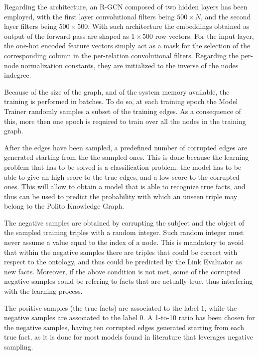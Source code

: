 \documentclass[%
    corpo=13.5pt,
    twoside,
    oldstyle,
    tipotesi=magistrale,
    greek,
    evenboxes
]{toptesi}
\begin{document}
Regarding the architecture, an R-GCN composed of two hidden layers has been employed,
with the first layer convolutional filters being $500 \times N$, and the second
layer filters being $500 \times 500$.
With such architecture the embeddings obtained as output of the forward pass
are shaped as $1 \times 500$ row vectors.
For the input layer, the one-hot encoded feature vectors simply act as a mask
for the selection of the corresponding column in the per-relation convolutional
filters.
Regarding the per-node normalization constants, they are initialized to the
inverse of the nodes indegree.

Because of the size of the graph, and of the system memory available, the
training is performed in batches.
To do so, at each training epoch the Model Trainer randomly samples a subset
of the training edges.
As a consequence of this, more then one epoch is required to train over all
the nodes in the training graph.

After the edges have been sampled, a predefined number of corrupted edges are
generated starting from the the sampled ones. This is done because the learning
problem that has to be solved is a classification problem: the model has to
be able to give an high score to the true edges, and a
low score to the corrupted ones.
This will allow to obtain a model that is able to recognize true facts, and
thus can be used to predict the probability with which an unseen triple
may belong to the Polito Knowledge Graph.

The negative samples are obtained by corrupting the subject and the object
of the sampled training triples with a random integer.
Such random integer must never assume a value equal to the index of a node.
This is mandatory to avoid that within the negative samples there
are triples that could be correct with respect to the ontology, and thus could
be predicted by the Link Evaluator as new facts.
Moreover, if the above condition is not met, some of the corrupted negative
samples could be refering to facts that are actually true, thus interfering
with the learning process.

The positive samples (the true facts) are associated to the label $1$, while
the negative samples are associated to the label $0$.
A 1-to-10 ratio has been chosen for the negative samples, having ten corrupted
edges generated starting from each true fact, as it is done for most models
found in literature that leverages negative sampling.
\end{document}
